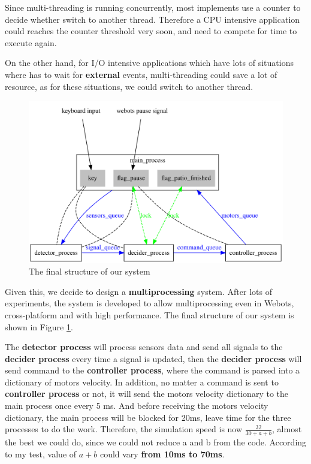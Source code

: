 Since multi-threading is running concurrently, most implements use a counter to decide whether switch to another thread. Therefore a CPU intensive application could reaches the counter threshold very soon, and need to compete for time to execute again.

On the other hand, for I/O intensive applications which have lots of situations where has to wait for \textbf{external} events, multi-threading could save a lot of resource, as for these situations, we could switch to another thread.

\begin{figure}[htbp]
    \centering
    \includegraphics[width=12cm]{implementation/img_song/system.pdf}
    \caption{The final structure of our system}
    \label{fig:system}
\end{figure}

Given this, we decide to design a \textbf{multiprocessing} system. After lots of experiments, the system is developed to allow multiprocessing even in Webots, cross-platform and with high performance. The final structure of our system is shown in Figure \ref{fig:system}.

The \textbf{detector process} will process sensors data and send all signals to the \textbf{decider process }every time a signal is updated, then the \textbf{decider process} will send command to the \textbf{controller process}, where the command is parsed into a dictionary of motors velocity. In addition, no matter a command is sent to \textbf{controller process} or not, it will send the motors velocity dictionary to the main process once every 5 ms. And before receiving the motors velocity dictionary, the main process will be blocked for 20ms, leave time for the three processes to do the work. Therefore, the simulation speed is now $\frac{32}{30+a+b}$, almost the best we could do, since we could not reduce a and b from the code. According to my test, value of $a+b$ could vary \textbf{from 10ms to 70ms}.

